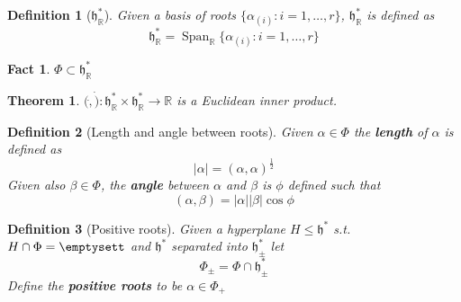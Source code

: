 \documentclass{article}
\newtheorem{theorem}{Theorem}[subsection]
\newtheorem{definition}{Definition}[subsection]
\newtheorem{fact}{Fact}[subsection]
\DeclareMathOperator{\spn}{Span}
\newcommand{\bam}[1]{\textbf{#1}}
\newcommand{\mf}[1]{\mathfrak{#1}}
\newcommand{\mbb}[1]{\mathbb{#1}}
\begin{document}
\begin{definition}[$\mf{h}^\ast_\mbb{R}$]
Given a basis of roots $\lbrace \alpha_{(i)} : i=1,\dots,r \rbrace$, $\mf{h}^\ast_\mbb{R}$ is defined as 
\[
\mf{h}^\ast_\mbb{R} = \spn_\mbb{R} \lbrace \alpha_{(i)} : i=1,\dots,r \rbrace
\]
\end{definition}

\begin{fact}
$\Phi\subset\mf{h}^\ast_\mbb{R}$
\end{fact}

\begin{theorem}
$(\dot,\dot): \mf{h}^\ast_\mbb{R} \times \mf{h}^\ast_\mbb{R} \to \mbb{R}$ is a Euclidean inner product. 
\end{theorem}

\begin{definition}[Length and angle between roots]
Given $\alpha\in\Phi$ the \bam{length} of $\alpha$ is defined as 
\[
|\alpha|=(\alpha,\alpha)^\frac{1}{2}
\]
Given also $\beta\in\Phi$, the \bam{angle} between $\alpha$ and $\beta$ is $\phi$ defined such that 
\[
(\alpha, \beta) = |\alpha||\beta|\cos{\phi}
\]
\end{definition}

\begin{definition}[Positive roots]
Given a hyperplane $H\leq\mf{h}^\ast$ s.t. $H\cap\Phi=\emptysett$ and $\mf{h}^\ast$ separated into $\mf{h}^\ast_\pm$ let 
\[
\Phi_\pm=\Phi\cap\mf{h}^\ast_\pm
\]
Define the \bam{positive roots} to be $\alpha\in\Phi_+$
\end{definition}
\end{document}

